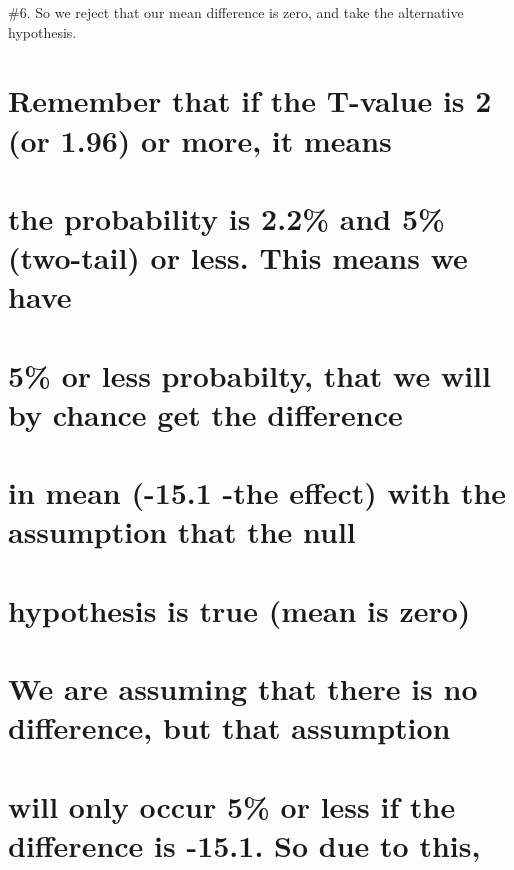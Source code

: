 \documentclass[
]{article}
\begin{document}
\#6. So we reject that our mean difference is zero, and take the
alternative hypothesis.

\hypertarget{remember-that-if-the-t-value-is-2-or-1.96-or-more-it-means}{%
\section{Remember that if the T-value is 2 (or 1.96) or more, it
means}\label{remember-that-if-the-t-value-is-2-or-1.96-or-more-it-means}}

\hypertarget{the-probability-is-2.2-and-5-two-tail-or-less.-this-means-we-have}{%
\section{the probability is 2.2\% and 5\% (two-tail) or less. This means
we
have}\label{the-probability-is-2.2-and-5-two-tail-or-less.-this-means-we-have}}

\hypertarget{or-less-probabilty-that-we-will-by-chance-get-the-difference}{%
\section{5\% or less probabilty, that we will by chance get the
difference}\label{or-less-probabilty-that-we-will-by-chance-get-the-difference}}

\hypertarget{in-mean--15.1--the-effect-with-the-assumption-that-the-null}{%
\section{in mean (-15.1 -the effect) with the assumption that the
null}\label{in-mean--15.1--the-effect-with-the-assumption-that-the-null}}

\hypertarget{hypothesis-is-true-mean-is-zero}{%
\section{hypothesis is true (mean is
zero)}\label{hypothesis-is-true-mean-is-zero}}

\hypertarget{we-are-assuming-that-there-is-no-difference-but-that-assumption}{%
\section{We are assuming that there is no difference, but that
assumption}\label{we-are-assuming-that-there-is-no-difference-but-that-assumption}}

\hypertarget{will-only-occur-5-or-less-if-the-difference-is--15.1.-so-due-to-this}{%
\section{will only occur 5\% or less if the difference is -15.1. So due
to
this,}\label{will-only-occur-5-or-less-if-the-difference-is--15.1.-so-due-to-this}}
\end{document}
